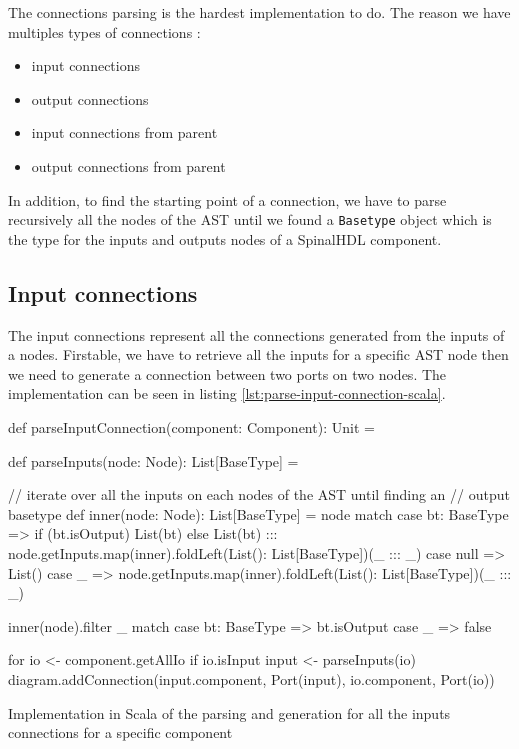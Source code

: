 The connections parsing is the hardest implementation to do. The reason we
have multiples types of connections :
\begin{itemize}
\item input connections
\item output connections
\item input connections from parent
\item output connections from parent
\end{itemize}

In addition, to find the starting point of a connection, we have to parse
recursively all the nodes of the AST until we found a \verb|Basetype| object
which is the type for the inputs and outputs nodes of a SpinalHDL component.

\subsection{Input connections}
\label{sec:input-connections}

The input connections represent all the connections generated from the inputs of a
nodes. Firstable, we have to retrieve all the inputs for a specific AST node
then we need to generate a connection between two ports on two nodes. The
implementation can be seen in listing \ref{lst:parse-input-connection-scala}.

\begin{listing}[H]
  \centering
  \begin{scalacode}
  def parseInputConnection(component: Component): Unit = {
      
    def parseInputs(node: Node): List[BaseType] = {
      
      // iterate over all the inputs on each nodes of the AST until finding an
      // output basetype
      def inner(node: Node): List[BaseType] = node match {
        case bt: BaseType =>
          if (bt.isOutput) List(bt)
          else List(bt) ::: node.getInputs.map(inner).foldLeft(List(): List[BaseType])(_ ::: _)
        case null => List()
        case _ => node.getInputs.map(inner).foldLeft(List(): List[BaseType])(_ ::: _)
      }

      inner(node).filter {
        _ match {
          case bt: BaseType => bt.isOutput
          case _ => false
        }
      }
    }

    for {
      io <- component.getAllIo
      if io.isInput
      input <- parseInputs(io)
    } {
      diagram.addConnection(input.component, Port(input), io.component, Port(io))
    }
  }
  \end{scalacode}
  \caption[Parsing and generation of the inputs connections]{Implementation in
    Scala of the parsing and generation for all the inputs connections for a
    specific component}
  \label{lst:parse-input-connection-scala}
\end{listing}

